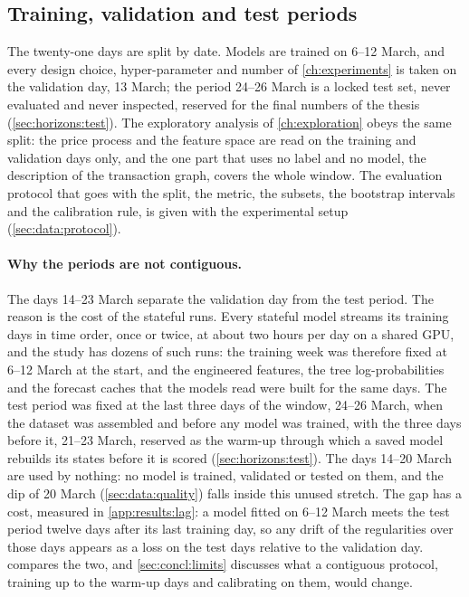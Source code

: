 \subsection{Training, validation and test periods}
\label{sec:data:splits}

The twenty-one days are split by date.  Models are trained on 6--12 March, and every
design choice, hyper-parameter and number of \cref{ch:experiments} is taken on the
validation day, 13 March; the period 24--26 March is a locked test set, never evaluated
and never inspected, reserved for the final numbers of the thesis
(\cref{sec:horizons:test}).  The exploratory analysis of \cref{ch:exploration} obeys the
same split: the price process and the feature space are read on the training and
validation days only, and the one part that uses no label and no model, the description
of the transaction graph, covers the whole window.  The evaluation protocol that goes with
the split, the metric, the subsets, the bootstrap intervals and the calibration rule, is
given with the experimental setup (\cref{sec:data:protocol}).

\paragraph{Why the periods are not contiguous.}  The days 14--23 March separate the
validation day from the test period.  The reason is the cost of the stateful runs.  Every
stateful model streams its training days in time order, once or twice, at about two hours
per day on a shared GPU, and the study has dozens of such runs: the training week was
therefore fixed at 6--12 March at the start, and the engineered features, the tree
log-probabilities and the forecast caches that the models read were built for the same
days.  The test period was fixed at the last three days of the window, 24--26 March, when
the dataset was assembled and before any model was trained, with the three days before it,
21--23 March, reserved as the warm-up through which a saved model rebuilds its states
before it is scored (\cref{sec:horizons:test}).  The days 14--20 March are used by
nothing: no model is trained, validated or tested on them, and the dip of 20 March
(\cref{sec:data:quality}) falls inside this unused stretch.  The gap has a cost, measured in
\cref{app:results:lag}: a model fitted on 6--12 March meets the test
period twelve days after its last training day, so any drift of the regularities over
those days appears as a loss on the test days relative to the validation day.
 compares the two, and \cref{sec:concl:limits} discusses what a
contiguous protocol, training up to the warm-up days and calibrating on them, would
change.


